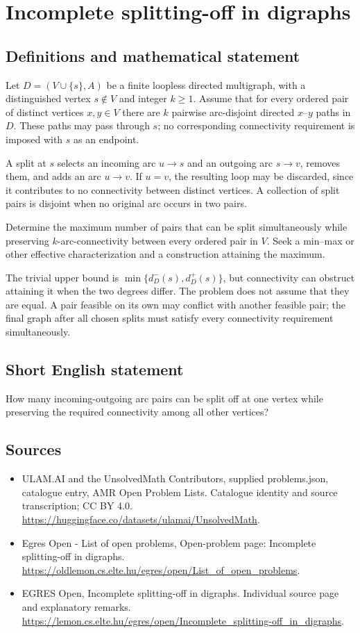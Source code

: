 \documentclass[11pt,a4paper]{article}
\begin{document}
\section*{Incomplete splitting-off in digraphs}\label{statement}

\subsection{Definitions and mathematical statement}
Let $D=(V\cup\{s\},A)$ be a finite loopless directed multigraph,
with a distinguished vertex $s\notin V$ and integer $k\ge1$.
Assume that for every ordered pair of distinct vertices $x,y\in V$
there are $k$ pairwise arc-disjoint directed $x$--$y$ paths in $D$.
These paths may pass through $s$; no corresponding connectivity
requirement is imposed with $s$ as an endpoint.

A split at $s$ selects an incoming arc $u\to s$ and an outgoing
arc $s\to v$, removes them, and adds an arc $u\to v$.
If $u=v$, the resulting loop may be discarded, since it contributes
to no connectivity between distinct vertices. A collection of split
pairs is disjoint when no original arc occurs in two pairs.

Determine the maximum number of pairs that can be split simultaneously
while preserving $k$-arc-connectivity between every ordered pair in
$V$. Seek a min--max or other effective characterization and a
construction attaining the maximum.

The trivial upper bound is $\min\{d_D^-(s),d_D^+(s)\}$, but connectivity
can obstruct attaining it when the two degrees differ. The problem
does not assume that they are equal. A pair feasible on its own may
conflict with another feasible pair; the final graph after all chosen
splits must satisfy every connectivity requirement simultaneously.
\subsection{Short English statement}
How many incoming-outgoing arc pairs can be split off at one
vertex while preserving the required connectivity among all other vertices?
\subsection{Sources}
\begin{itemize}
\item[S1] ULAM.AI and the UnsolvedMath Contributors, supplied problems.json, catalogue entry, AMR Open Problem Lists. Catalogue identity and source transcription; CC BY 4.0.
\url{https://huggingface.co/datasets/ulamai/UnsolvedMath}.
\item[S2] Egres Open - List of open problems, Open-problem page: Incomplete splitting-off in digraphs. 
\url{https://oldlemon.cs.elte.hu/egres/open/List_of_open_problems}.
\item[S3] EGRES Open, Incomplete splitting-off in digraphs. Individual source page and explanatory remarks.
\url{https://lemon.cs.elte.hu/egres/open/Incomplete_splitting-off_in_digraphs}.
\end{itemize}
\end{document}
